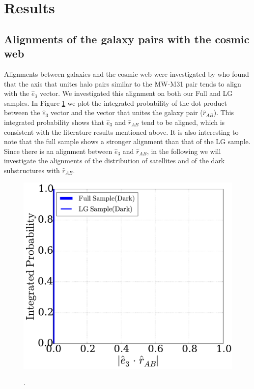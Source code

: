 \section{Results}
\label{Results}


\subsection{Alignments of the galaxy pairs with the cosmic web}
\label{AlignmentsGalCosmicWeb}
Alignments between galaxies and the cosmic web were investigated by \citep{ForeroRomero2013} who found that the axis that unites halo pairs similar to the MW-M31 pair tends to align with the $\hat e_3$ vector. 
We investigated this alignment on both our Full and LG samples. 
In Figure \ref{fig:alignment_e3_cosmicweb} we plot the integrated probability of the dot product between the $\hat e_3$ vector and the vector that unites the galaxy pair ($\hat r_{AB}$). 
This integrated probability shows that $\hat e_3$ and $\hat r_{AB}$ tend to be aligned, which is consistent with the literature results mentioned above. 
It is also interesting to note that the full sample shows a stronger alignment than that of the LG sample. Since there is an alignment between $\hat e_3$ and $\hat r_{AB}$, in the following we will investigate the alignments of the distribution of satellites and of the dark substructures with $\hat r_{AB}$.\\
\begin{figure}
\includegraphics[width=\hsize]{r_tweb_e3_alignment.pdf}\\
\caption{.}
\label{fig:alignment_e3_cosmicweb}
\end{figure}

